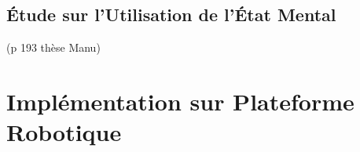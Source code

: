 \documentclass[a4paper,11pt,twoside]{StyleThese}
\begin{document}
\subsection{Étude sur l'Utilisation de l'État Mental}
(p 193 thèse Manu)

\section{Implémentation sur Plateforme Robotique}









\ifdefined{}
\else


\end{document}
